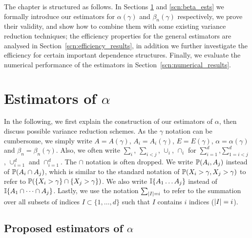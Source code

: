 The chapter is structured as follows. In Sections \ref{scn:alpha_ests} and \ref{scn:beta_ests} we formally introduce our estimators for $\alpha(\gamma)$ and $\beta_n(\gamma)$ respectively,
we prove their validity, and
show how to combine them with some existing variance reduction techniques; the efficiency properties
for the general estimators are analysed in Section~\ref{scn:efficiency_results}, in addition we further investigate
the efficiency for certain important dependence structures. Finally, we evaluate the numerical performance of the
estimators in Section~\ref{scn:numerical_results}.

\section{Estimators of $\alpha$} \label{scn:alpha_ests}

In the following, we first explain the construction of our estimators of $\alpha$, then discuss possible variance reduction schemes. As the $\gamma$ notation can be cumbersome, we simply write $A=A(\gamma)$, $A_i = A_i(\gamma)$, $E = E(\gamma)$, $\alpha = \alpha(\gamma)$ and $\beta_n = \beta_n(\gamma)$. Also, we often write $\sum_i$, $\sum_{i<j}$, $\cup_i$, $\cap_i$ for $\sum_{i=1}^d$,$\sum_{1=i<j}^d$, $\cup_{i=1}^d$ and $\cap_{i=1}^d$.
The $\cap$ notation is often dropped. We write $\operatorname{{\mathbb P}}(A_i, A_j)$ instead of $\operatorname{{\mathbb P}}(A_i \cap A_j)$, which is similar to the standard notation of $\operatorname{{\mathbb P}}(X_i > \gamma, X_j > \gamma)$ to refer to $\operatorname{{\mathbb P}}(\{X_i > \gamma\} \cap \{X_j > \gamma\})$. We also write $\mathbb{I}\{  A_1 \dots A_j \}$ instead of $\mathbb{I}\{  A_1 \cap \dots \cap A_j \}$.
Lastly, we use the notation $\sum_{\lvert I\rvert = i}$ to refer to the summation over all subsets of indices $I \subset \{1, \dots, d\}$ such that $I$ contains $i$ indices ($\lvert I\rvert = i$).

\subsection{Proposed estimators of $\alpha$}

